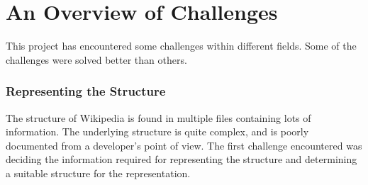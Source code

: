 \section{An Overview of Challenges}
This project has encountered some challenges within different fields. Some of the challenges were solved better than others. 

\subsubsection{Representing the Structure}
The structure of Wikipedia is found in multiple files containing lots of information. The underlying structure is quite complex, and is poorly documented from a developer's point of view. The first challenge encountered was deciding the information required for representing the structure and determining a suitable structure for the representation.

